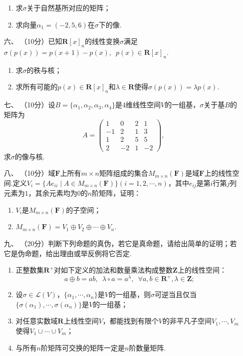 \begin{enumerate}
    \begin{enumerate}[label=(\arabic*)]
        \item 求$\sigma$关于自然基所对应的矩阵；
        \item 求向量$\alpha_1=(-2,5,6)$在$\sigma$下的像.
    \end{enumerate}
	\item[六、] （10分）已知$\mathbf{R}[x]_n$的线性变换$\sigma$满足$\sigma(p(x))=p(x+1)-p(x),\enspace p(x)\in\mathbf{R}[x]_n$.
	\begin{enumerate}[label=(\arabic*)]
        \item 求$\sigma$的秩与核；
        \item 求所有可能的$p(x)\in\mathbf{R}[x]_n$和$\lambda\in\mathbf{R}$使得$\sigma(p(x))=\lambda p(x)$.
    \end{enumerate}
	\item[七、]（10分）设$B=\{\alpha_1,\alpha_2,\alpha_3,\alpha_4\}$是4维线性空间$V$的一组基，$\sigma$关于基$B$的矩阵为
    \[A=\begin{pmatrix}1 & 0 & 2 & 1 \\ -1 & 2 & 1 & 3 \\ 1 & 2 & 5 & 5 \\ 2 & -2 & 1 & -2\end{pmatrix},\]
    求$\sigma$的像与核.
    \item[八、]（10分）域$\mathbf{F}$上所有$m\times n$矩阵组成的集合$M_{m\times n}(\mathbf{F})$是域$\mathbf{F}$上的线性空间.定义$V_i=\{Ae_{ii}\mid A\in M_{m\times n}(\mathbf{F})\}(i=1,2,\cdots,n)$，其中$e_{ij}$是第$i$行第$j$列元素为$1$，其余元素均为$0$的$n$阶矩阵，证明：
    \begin{enumerate}[label=(\arabic*)]
        \item $V_i$是$M_{m\times n}(\mathbf{F})$的子空间；
        \item $M_{m\times n}(\mathbf{F})=V_1\oplus V_2\oplus\cdots\oplus V_n$.
    \end{enumerate}
	\item[九、]（20分）判断下列命题的真伪，若它是真命题，请给出简单的证明；若它是伪命题，给出理由或举反例将它否定.
    \begin{enumerate}[label=(\arabic*)]
        \item 正整数集$\mathbf{R}^+$对如下定义的加法和数量乘法构成整数$\mathbf{Z}$上的线性空间：
        \[a\oplus b=ab,\enspace\lambda\circ a=a^\lambda,\enspace\forall a,b\in\mathbf{R}^+,\lambda\in\mathbf{Z};\]
        \item 设$\sigma\in\mathcal{L}(V)$，$\{\alpha_1,\cdots,\alpha_n\}$是$V$的一组基，则$\sigma$可逆当且仅当$\{\sigma(\alpha_1),\cdots,\sigma(\alpha_n)\}$是$V$的一组基；
        \item 对任意实数域$\mathbf{R}$上线性空间$V$，都能找到有限个$V$的非平凡子空间$V_1,\cdots,V_m$使得$V_1\cup\cdots\cup V_m$；
        \item 与所有$n$阶矩阵可交换的矩阵一定是$n$阶数量矩阵.
    \end{enumerate}
\end{enumerate}

\clearpage
